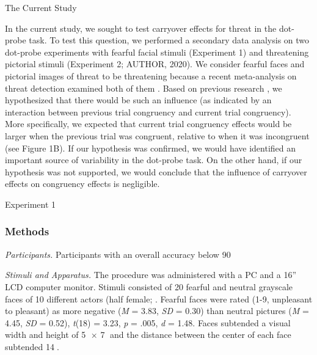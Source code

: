 \documentclass{article}
\begin{document}
	The Current Study



	In the current study, we sought to test carryover effects for threat in the dot-probe task. To test this question, we performed a secondary data analysis on two dot-probe experiments with fearful facial stimuli (Experiment 1) and threatening pictorial stimuli (Experiment 2; AUTHOR, 2020). We consider fearful faces and pictorial images of threat to be threatening because a recent meta-analysis on threat detection examined both of them \autocite{Hedger2016}. Based on previous research \autocite{Gladwin2019a}\autocite{Gladwin2020}, we hypothesized that there would be such an influence (as indicated by an interaction between previous trial congruency and current trial congruency). More specifically, we expected that current trial congruency effects would be larger when the previous trial was congruent, relative to when it was incongruent (see Figure 1B). If our hypothesis was confirmed, we would have identified an important source of variability in the dot-probe task. On the other hand, if our hypothesis was not supported, we would conclude that the influence of carryover effects on congruency effects is negligible.



	Experiment 1



	\subsubsection{Methods}



	\emph{Participants. }Participants with an overall accuracy below 90%



	\emph{Stimuli and Apparatus. }The procedure was administered with a PC and a 16” LCD computer monitor. Stimuli consisted of 20 fearful and neutral grayscale faces of 10 different actors (half female; \autocite{Gur2002}\autocite{Lundqvist1998}. Fearful faces were rated (1-9, unpleasant to pleasant) as more negative (\emph{M} = 3.83, \emph{SD} = 0.30) than neutral pictures (\emph{M} = 4.45, \emph{SD} = 0.52), \emph{t}(18) = 3.23, \emph{p} = .005, \emph{d} = 1.48. Faces subtended a visual width and height of 5 × 7 and the distance between the center of each face subtended 14.
\end{document}
